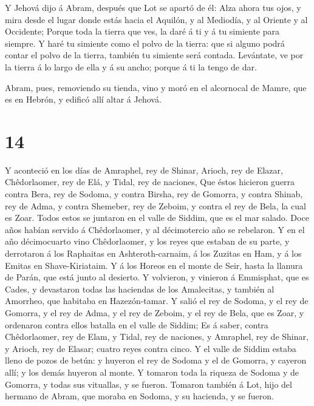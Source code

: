  Y Jehová dijo á Abram, después que Lot se apartó de él:
Alza ahora tus ojos, y mira desde el lugar donde estás hacia el Aquilón,
y al Mediodía, y al Oriente y al Occidente;  Porque toda la
tierra que ves, la daré á ti y á tu simiente para siempre. 
Y haré tu simiente como el polvo de la tierra: que si alguno podrá
contar el polvo de la tierra, también tu simiente será contada.
 Levántate, ve por la tierra á lo largo de ella y á su
ancho; porque á ti la tengo de dar.

 Abram, pues, removiendo su tienda, vino y moró en el
alcornocal de Mamre, que es en Hebrón, y edificó allí altar á Jehová.

\hypertarget{section-13}{%
\section{14}\label{section-13}}

 Y aconteció en los días de Amraphel, rey de Shinar, Arioch,
rey de Elazar, Chêdorlaomer, rey de Elá, y Tidal, rey de naciones,
 Que éstos hicieron guerra contra Bera, rey de Sodoma, y
contra Birsha, rey de Gomorra, y contra Shinab, rey de Adma, y contra
Shemeber, rey de Zeboim, y contra el rey de Bela, la cual es Zoar.
 Todos estos se juntaron en el valle de Siddim, que es el
mar salado.  Doce años habían servido á Chêdorlaomer, y al
décimotercio año se rebelaron.  Y en el año décimocuarto
vino Chêdorlaomer, y los reyes que estaban de su parte, y derrotaron á
los Raphaitas en Ashteroth-carnaim, á los Zuzitas en Ham, y á los Emitas
en Shave-Kiriataim.  Y á los Horeos en el monte de Seir,
hasta la llanura de Parán, que está junto al desierto.  Y
volvieron, y vinieron á Emmisphat, que es Cades, y devastaron todas las
haciendas de los Amalecitas, y también al Amorrheo, que habitaba en
Hazezón-tamar.  Y salió el rey de Sodoma, y el rey de
Gomorra, y el rey de Adma, y el rey de Zeboim, y el rey de Bela, que es
Zoar, y ordenaron contra ellos batalla en el valle de Siddim;
 Es á saber, contra Chêdorlaomer, rey de Elam, y Tidal, rey
de naciones, y Amraphel, rey de Shinar, y Arioch, rey de Elasar; cuatro
reyes contra cinco.  Y el valle de Siddim estaba lleno de
pozos de betún: y huyeron el rey de Sodoma y el de Gomorra, y cayeron
allí; y los demás huyeron al monte.  Y tomaron toda la
riqueza de Sodoma y de Gomorra, y todas sus vituallas, y se fueron.
 Tomaron también á Lot, hijo del hermano de Abram, que
moraba en Sodoma, y su hacienda, y se fueron.

